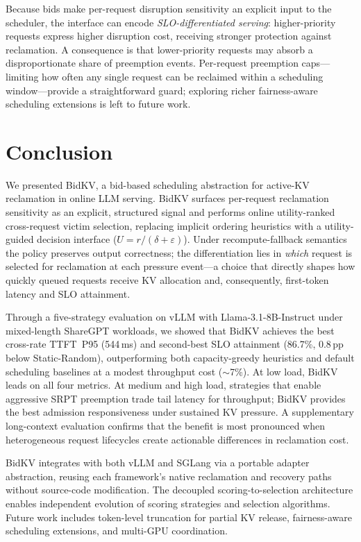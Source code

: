 \documentclass[sigconf,nonacm]{acmart}
\newcommand{\bidkv}{BidKV\xspace}
\newcommand{\utilfn}{\ensuremath{U}}
\newcommand{\tokfree}{\ensuremath{r}}
\newcommand{\qualdelta}{\ensuremath{\delta}}
\newcommand{\stabeps}{\ensuremath{\varepsilon}}
\begin{document}
Because bids make per-request disruption sensitivity an explicit input to the
scheduler, the interface can encode \emph{SLO-differentiated serving}:
higher-priority requests express higher disruption cost, receiving stronger
protection against reclamation.  A consequence is that lower-priority requests
may absorb a disproportionate share of preemption events.  Per-request
preemption caps---limiting how often any single request can be reclaimed within
a scheduling window---provide a straightforward guard; exploring richer
fairness-aware scheduling extensions is left to future work.

\section{Conclusion}\label{sec:conclusion}

We presented \bidkv, a bid-based scheduling abstraction for active-KV
reclamation in online LLM serving.  \bidkv surfaces per-request reclamation
sensitivity as an explicit, structured signal and performs online
utility-ranked cross-request victim selection, replacing implicit ordering
heuristics
with a utility-guided decision interface
($\utilfn = \tokfree / (\qualdelta + \stabeps)$).  Under recompute-fallback
semantics the policy preserves output correctness; the differentiation lies
in \emph{which} request is selected for reclamation at each pressure
event---a choice that directly shapes how quickly queued requests receive KV
allocation and, consequently, first-token latency and SLO attainment.

Through a five-strategy evaluation on vLLM with Llama-3.1-8B-Instruct under
mixed-length ShareGPT workloads, we showed that \bidkv achieves the best cross-rate TTFT~P95 (544\,ms) and
second-best SLO attainment (86.7\%, 0.8\,pp below Static-Random),
outperforming both capacity-greedy heuristics and default scheduling
baselines at a modest throughput cost (${\sim}$7\%).  At low load, \bidkv leads on all four metrics.
At medium and high load, strategies that enable aggressive SRPT preemption
trade tail latency for throughput; \bidkv provides the best admission
responsiveness under sustained KV pressure.  A supplementary long-context
evaluation confirms that the benefit is most pronounced when heterogeneous
request lifecycles create actionable differences in reclamation cost.

\bidkv integrates with both vLLM and SGLang via a portable adapter
abstraction, reusing each framework's native reclamation and recovery paths
without source-code modification.  The decoupled scoring-to-selection architecture enables
independent evolution of scoring strategies and selection algorithms.  Future
work includes token-level truncation for partial KV release, fairness-aware
scheduling extensions, and multi-GPU coordination.



\end{document}
